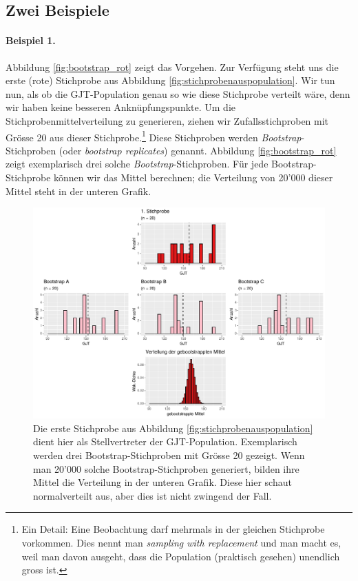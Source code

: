 \documentclass[oneside, 10pt]{book}\usepackage[]{graphicx}\usepackage[]{xcolor}
\newenvironment{knitrout}{}{} %
\begin{document}
\subsection{Zwei Beispiele}

\paragraph{Beispiel 1.}
Abbildung \vref{fig:bootstrap_rot} zeigt das Vorgehen.
Zur Verfügung steht uns die erste (rote) Stichprobe aus Abbildung
\ref{fig:stichprobenauspopulation}. Wir tun nun, als ob die GJT-Population
genau so wie diese Stichprobe verteilt wäre, denn wir haben
keine besseren Anknüpfungspunkte. Um die Stichprobenmittelverteilung
zu generieren, ziehen wir Zufallsstichproben mit Grösse 20
aus dieser Stichprobe.\footnote{Ein Detail: Eine Beobachtung
darf mehrmals in der gleichen Stichprobe vorkommen. Dies nennt
man \textit{sampling with replacement} und man macht es, weil
man davon ausgeht, dass die Population (praktisch gesehen) unendlich gross ist.}
Diese Stichproben werden
\textit{Bootstrap}-Stichproben (oder \textit{bootstrap replicates})
genannt. Abbildung \ref{fig:bootstrap_rot} zeigt exemplarisch
drei solche \textit{Bootstrap}-Stichproben.
Für jede Bootstrap-Stichprobe können wir das Mittel berechnen;
die Verteilung von 20'000 dieser Mittel steht in der unteren Grafik.

\begin{knitrout}
\color{fgcolor}\begin{figure}[tp]

{\centering \includegraphics[width=\textwidth]{figs/unnamed-chunk-142-1} 

}

\caption{Die erste Stichprobe aus Abbildung \ref{fig:stichprobenauspopulation} dient hier als Stellvertreter der GJT-Population. Exemplarisch werden drei Bootstrap-Stichproben mit Grösse 20 gezeigt. Wenn man 20'000 solche Bootstrap-Stichproben generiert, bilden ihre Mittel die Verteilung in der unteren Grafik. Diese hier schaut normalverteilt aus, aber dies ist nicht zwingend der Fall.\label{fig:bootstrap_rot}}\label{fig:unnamed-chunk-142}
\end{figure}

\end{knitrout}
\end{document}
